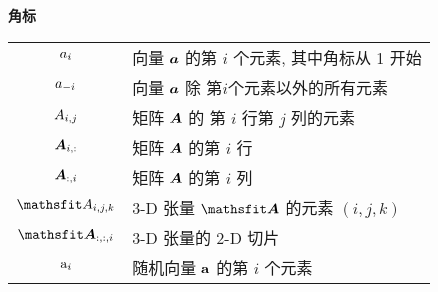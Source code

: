 \vspace{\notationgap}
\begin{minipage}{\textwidth}
\centerline{\bf 角标}
\bgroup
\def\arraystretch{1.5}
\begin{tabular}{cp{3.25in}}
$\displaystyle {a}_i$ & 向量 ${\bm{a}}$ 的第 $i$ 个元素, 其中角标从 1 开始 \\
$\displaystyle {a}_{-i}$ & 向量 ${\bm{a}}$ 除 第$i$个元素以外的所有元素 \\
$\displaystyle {A}_{i,j}$ & 矩阵 ${\bm{A}}$ 的 第 $i$ 行第 $j$ 列的元素\\
$\displaystyle {\bm{A}}_{i, :}$ & 矩阵 ${\bm{A}}$ 的第 $i$ 行\\
$\displaystyle {\bm{A}}_{:, i}$ & 矩阵 ${\bm{A}}$ 的第 $i$ 列 \\
$\displaystyle \etA_{i, j, k}$ & 3-D 张量 $\tA$ 的元素 $(i, j, k)$\\
$\displaystyle \tA_{:, :, i}$ & 3-D 张量的 2-D 切片\\
$\displaystyle {\textnormal{a}}_i$ & 随机向量 ${\mathbf{a}}$ 的第 $i$ 个元素\\
\end{tabular}
\egroup
\end{minipage}

